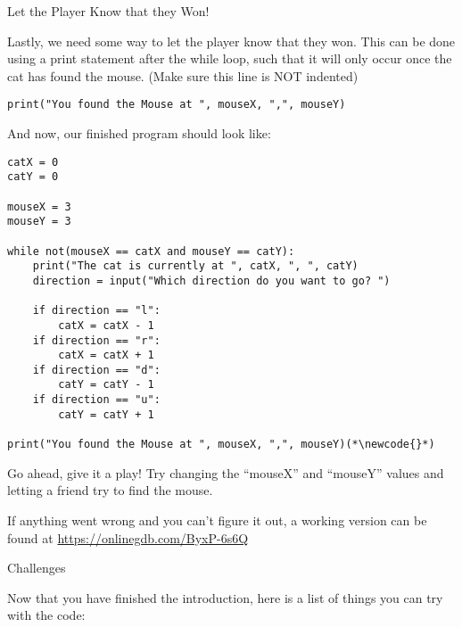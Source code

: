 \documentclass[12pt,oneside]{article}
\newcommand{\q}[1]{``#1''}
\newcommand{\subsectitle}[1]{
  \begin{flushleft}{\large#1}\end{flushleft}
}
\newcommand{\sectitle}[1]{
  \newpage
  \begin{flushleft}{\huge#1}\end{flushleft}
}
\newcommand{\newcode}[0]{\hfill<--}
\begin{document}
\begin{minipage}{\textwidth}
\subsectitle{Let the Player Know that they Won!}

Lastly, we need some way to let the player know that they won. This can be done using a print statement after the while loop, such that it will only occur once the cat has found the mouse. (Make sure this line is NOT indented)

\begin{lstlisting}
print("You found the Mouse at ", mouseX, ",", mouseY)
\end{lstlisting}

And now, our finished program should look like:

\begin{lstlisting}
catX = 0
catY = 0

mouseX = 3
mouseY = 3

while not(mouseX == catX and mouseY == catY):
    print("The cat is currently at ", catX, ", ", catY)
    direction = input("Which direction do you want to go? ")
    
    if direction == "l":
        catX = catX - 1
    if direction == "r":
        catX = catX + 1
    if direction == "d":
        catY = catY - 1
    if direction == "u":
        catY = catY + 1

print("You found the Mouse at ", mouseX, ",", mouseY)(*\newcode{}*)
\end{lstlisting}

Go ahead, give it a play! Try changing the \q{mouseX} and \q{mouseY} values and letting a friend try to find the mouse. 

If anything went wrong and you can't figure it out, a working version can be found at \url{https://onlinegdb.com/ByxP-6s6Q}

\end{minipage}

\sectitle{Challenges}

Now that you have finished the introduction, here is a list of things you can try with the code:
\end{document}
